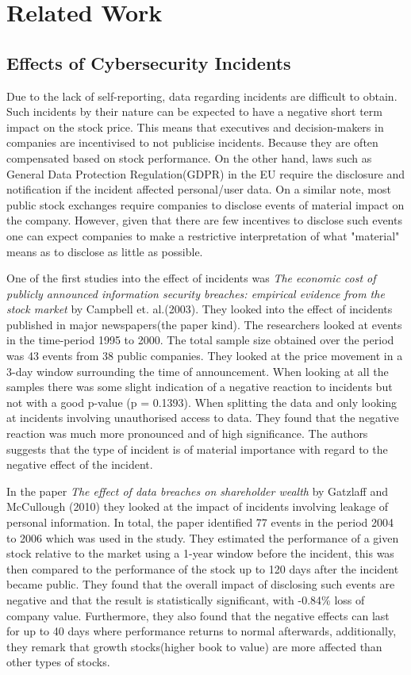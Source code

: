 \chapter{Related Work}
\label{chap:relwork}

\section{Effects of Cybersecurity Incidents}
Due to the lack of self-reporting, data regarding incidents are difficult to obtain. Such incidents by their nature can be expected to have a negative short term impact on the stock price. This means that executives and decision-makers in companies are incentivised to not publicise incidents. Because they are often compensated based on stock performance. On the other hand, laws such as General Data Protection Regulation(GDPR) in the EU require the disclosure and notification if the incident affected personal/user data. On a similar note, most public stock exchanges require companies to disclose events of material impact on the company. However, given that there are few incentives to disclose such events one can expect companies to make a restrictive interpretation of what "material" means as to disclose as little as possible. 

One of the first studies into the effect of incidents was \textit{The economic cost of publicly announced information security breaches: empirical evidence from the stock market} by Campbell et. al.(2003)\cite{campbell2003economic}. They looked into the effect of incidents published in major newspapers(the paper kind). The researchers looked at events in the time-period 1995 to 2000. The total sample size obtained over the period was 43 events from 38 public companies. They looked at the price movement in a 3-day window surrounding the time of announcement. When looking at all the samples there was some slight indication of a negative reaction to incidents but not with a good p-value (p = 0.1393). When splitting the data and only looking at incidents involving unauthorised access to data. They found that the negative reaction was much more pronounced and of high significance. The authors suggests that the type of incident is of material importance with regard to the negative effect of the incident.

In the paper \textit{The effect of data breaches on shareholder wealth} by Gatzlaff and McCullough (2010)\cite{gatzlaff2010effect} they looked at the impact of incidents involving leakage of personal information. In total, the paper identified 77 events in the period 2004 to 2006 which was used in the study. They estimated the performance of a given stock relative to the market using a 1-year window before the incident, this was then compared to the performance of the stock up to 120 days after the incident became public. They found that the overall impact of disclosing such events are negative and that the result is statistically significant, with -0.84\% loss of company value. Furthermore, they also found that the negative effects can last for up to 40 days where performance returns to normal afterwards, additionally, they remark that growth stocks(higher book to value) are more affected than other types of stocks.

